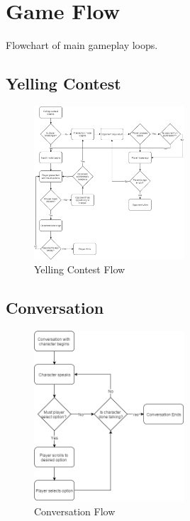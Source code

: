 \section{Game Flow}
Flowchart of main gameplay loops.

\subsection{Yelling Contest}
\begin{figure}[H]
\centering\includegraphics[width=0.5\textwidth, height=0.8\paperheight, keepaspectratio=true]{images/YellingContest}
  \caption{Yelling Contest Flow}
  \label{fig:flow_yelling_contest}
\end{figure}

\subsection{Conversation}
\begin{figure}[H]
\centering\includegraphics[width=0.5\textwidth, height=0.8\paperheight, keepaspectratio=true]{images/Conversation}
  \caption{Conversation Flow}
  \label{fig:flow_conversation}
\end{figure}

